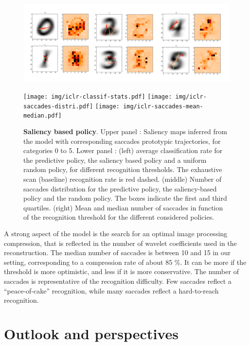 \documentclass{article} %
\begin{document}
\\
\begin{figure}[b!]
	\centerline{
		\includegraphics[width = \linewidth]{img/ICLR-saliency-maps.png} 
	}
	\centerline{
		\hfill
		\texttt{[image: img/iclr-classif-stats.pdf]}
		\hfill
		\texttt{[image: img/iclr-saccades-distri.pdf]}
		\hfill	 
		\texttt{[image: img/iclr-saccades-mean-median.pdf]}
		\hfill
	}	
	\caption{\textbf{Saliency based policy}. Upper panel : Saliency maps inferred from the model with corresponding saccades prototypic trajectories, for categories 0 to 5. Lower panel : (left) average classification rate for the predictive policy, the saliency based policy and a uniform random policy, for different recognition thresholds. The exhaustive scan (baseline) recognition rate is  red dashed. (middle) Number of saccades distribution for the predictive policy, the saliency-based policy and the random policy. The boxes indicate the first and third quartiles. (right) Mean and median number of saccades in function of the recognition threshold for the different considered policies. }\label{fig:saliency-maps}
\end{figure}

{\color{blue} A strong aspect of the model is the search for an optimal image processing compression, that is reflected in the number of wavelet coefficients used in the reconstruction. The median number of saccades is between 10 and 15 in our setting, corresponding to a compression rate of about 85 \%. It can be more if the threshold is more optimistic, and less if it is more conservative. The number of saccades is representative of the recognition difficulty. Few saccades reflect a ``peace-of-cake'' recognition, while many saccades reflect a hard-to-reach recognition.  }

\section{Outlook and perspectives}
\end{document}
